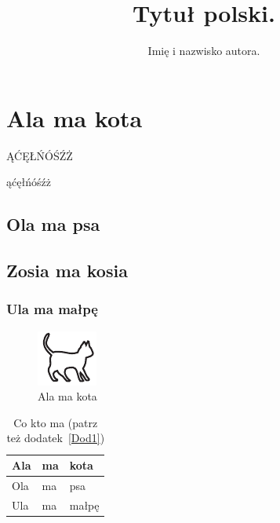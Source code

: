 \documentclass[magister,druk,polski]{dyplom}
\author{Imię i nazwisko autora.}
\title{Tytuł  polski.}
\begin{document}
\maketitle

\tableofcontents
\listoffigures
\listoftables



\chapter{Ala ma kota}

ĄĆĘŁŃÓŚŹŻ

ąćęłńóśźż

\lipsum[1]

\section{Ola ma psa}

\lipsum[2-3]

\section{Zosia ma kosia}

\lipsum[7]

\subsection{Ula ma małpę}

\lipsum[4-10]

\begin{figure}
\includegraphics[width=.4\textwidth]{kotek}
\caption{Ala ma kota}
\end{figure}

\lipsum[11-15]

\begin{table}
\caption{Co kto ma \cite{harel_rzecz_2008} (patrz też dodatek~\ref{Dod1})}
\begin{tabular}{|l|l|l|}
\hline
Ala & ma & kota \\
\hline
Ola & ma & psa \\
\hline
Ula & ma & małpę\\
\hline
\end{tabular}
\end{table}
\end{document}
